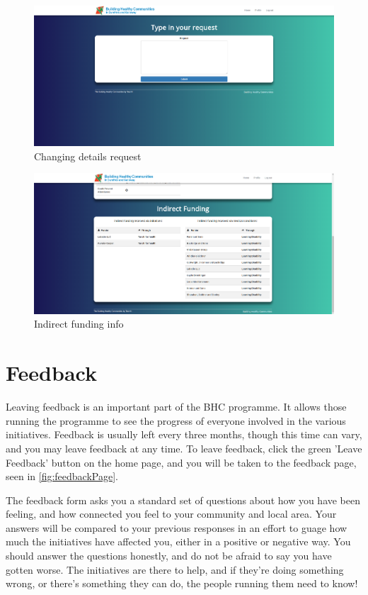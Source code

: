 \documentclass{bhcguides}
\begin{document}
\begin{figure}[h]
 \centerline{\includegraphics[width=\textwidth, height=\textheight, keepaspectratio]{detailchange.png}}
 \caption{Changing details request}
 \label{fig:detailChange}
\end{figure}

\begin{figure}[h]
 \centerline{\includegraphics[width=\textwidth, height=\textheight, keepaspectratio]{fundinginfo.png}}
 \caption{Indirect funding info}
 \label{fig:fundingInfo}
\end{figure}

\section{Feedback}
\label{sec:feedback}

Leaving feedback is an important part of the BHC programme. It allows those running the programme to see the progress of everyone involved in the various initiatives. Feedback is usually left every three months, though this time can vary, and you may leave feedback at any time. To leave feedback, click the green 'Leave Feedback' button on the home page, and you will be taken to the feedback page, seen in \autoref{fig:feedbackPage}.

The feedback form asks you a standard set of questions about how you have been feeling, and how connected you feel to your community and local area. Your answers will be compared to your previous responses in an effort to guage how much the initiatives have affected you, either in a positive or negative way. You should answer the questions honestly, and do not be afraid to say you have gotten worse. The initiatives are there to help, and if they're doing something wrong, or there's something they can do, the people running them need to know!
\end{document}
